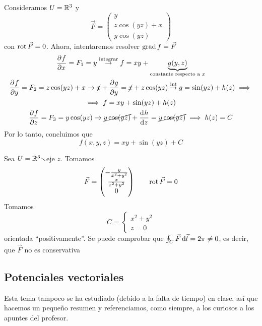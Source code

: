 \begin{example*}
    Consideramos $U = \mathbb{R}^3$ y 
    \[
        \vec{F} =
        \begin{pmatrix}
            y \\ z \cos (yz) + x \\ y \cos(yz)
        \end{pmatrix}
    \]
    con $\operatorname{rot} \vec{F} = 0$. Ahora, intentaremos resolver $\operatorname{grad} f = \vec{F}$
    \begin{gather*}
        \pdv{f}{x} = F_1 = y \stackrel{\text{integrar}}{\rightarrow} f = xy + \underbrace{g(y,z)}_{\text{constante respecto a } x} \\
        \pdv{f}{y} = F_2 = z \cos(yz) + x \rightarrow \cancel{x} + \pdv{g}{y} = \cancel{x} + z \cos(yz) \stackrel{\text{int}}{\rightarrow}
        g = \sin(yz) + h(z) \implies \\ \implies f = xy + \sin(yz) + h(z) \\
        \pdv{f}{z} = F_3 = y \cos (yz) \rightarrow \cancel{y \cos(yz)} + \dv{h}{z} = \cancel{y \cos(yz)} \implies h(z) = C
    \end{gather*}
    Por lo tanto, concluimos que
    \[
        f(x, y, z) = xy + \sin(yz) + C
    \]
\end{example*}

\begin{example*}
    Sea $U = \mathbb{R}^3 \smallsetminus$eje $z$. Tomamos
    \[
        \vec{F} = 
        \begin{pmatrix}
            -\frac{y}{x^2 + y^2} \\ \frac{x}{x^2+y^2} \\ 0
        \end{pmatrix}
        \qquad
        \operatorname{rot} \vec{F} = 0
    \]
    Tomamos
    \[
        C =
        \begin{cases}
            x^2 + y^2 \\ z = 0
        \end{cases}
    \]
    orientada ``positivamente''. Se puede comprobar que $\oint_C \vec{F} \dif \vec{l} = 2\pi \neq 0$, es decir,
    que $\vec{F}$ no es conservativa
\end{example*}

\subsection*{Potenciales vectoriales}

Esta tema tampoco se ha estudiado (debido a la falta de tiempo) en clase, así que hacemos un pequeño resumen y referenciamos, como
siempre, a los curiosos a los apuntes del profesor.

